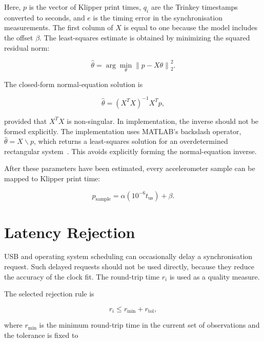 \documentclass[11pt,a4paper]{article}
\begin{document}
Here, \(p\) is the vector of Klipper print times, \(q_i\) are the Trinkey
timestamps converted to seconds, and \(e\) is the timing error in the
synchronisation measurements. The first column of \(X\) is equal to one because
the model includes the offset \(\beta\). The least-squares estimate is obtained
by minimizing the squared residual norm:

\begin{equation}
    \hat{\theta}
    =
    \arg\min_{\theta} \left\|p - X\theta\right\|_2^2.
\end{equation}

The closed-form normal-equation solution is

\begin{equation}
    \hat{\theta} = (X^T X)^{-1} X^T p,
    \label{eq:matrix_ls}
\end{equation}

provided that \(X^T X\) is non-singular. In implementation, the inverse should
not be formed explicitly. The implementation uses MATLAB's backslash operator,
\(\hat{\theta} = X \backslash p\), which returns a least-squares solution for an
overdetermined rectangular system~\cite{mathworksmldivide}. This avoids explicitly
forming the normal-equation inverse.

After these parameters have been estimated, every accelerometer sample can be
mapped to Klipper print time:

\begin{equation}
    p_{\mathrm{sample}} =
    \alpha \left(10^{-6} t_{\mathrm{us}}\right) + \beta.
    \label{eq:sample_mapping}
\end{equation}

\section{Latency Rejection}

USB and operating system scheduling can occasionally delay a synchronisation
request. Such delayed requests should not be used directly, because they reduce
the accuracy of the clock fit. The round-trip time \(r_i\) is used as a quality
measure.

The selected rejection rule is

\begin{equation}
    r_i \leq r_{\min} + r_{\mathrm{tol}},
\end{equation}

where \(r_{\min}\) is the minimum round-trip time in the current set of
observations and the tolerance is fixed to
\end{document}
